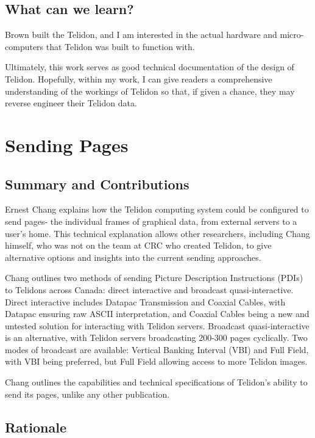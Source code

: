 \documentclass[sigconf]{acmart}
\begin{document}
\subsection{What can we learn?}

Brown built the Telidon, and I am interested in the actual hardware and micro-computers that Telidon was built to function with.

Ultimately, this work serves as good technical documentation of the design of Telidon. Hopefully, within my work, I can give readers a comprehensive understanding of the workings of Telidon so that, if given a chance, they may reverse engineer their Telidon data. 

\section{Sending Pages}


\subsection{Summary and Contributions}

Ernest Chang explains how the Telidon computing system could be configured to send pages- the individual frames of graphical data, from external servers to a user's home. This technical explanation allows other researchers, including Chang himself, who was not on the team at CRC who created Telidon, to give alternative options and insights into the current sending approaches.

Chang outlines two methods of sending Picture Description Instructions (PDIs) to Telidons across Canada: direct interactive and broadcast quasi-interactive. Direct interactive includes Datapac Transmission and Coaxial Cables, with Datapac ensuring raw ASCII interpretation, and Coaxial Cables being a new and untested solution for interacting with Telidon servers. Broadcast quasi-interactive is an alternative, with Telidon servers broadcasting 200-300 pages cyclically. Two modes of broadcast are available: Vertical Banking Interval (VBI) and Full Field, with VBI being preferred, but Full Field allowing access to more Telidon images.

Chang outlines the capabilities and technical specifications of Telidon's ability to send its pages, unlike any other publication. 

\subsection{Rationale}
\end{document}
